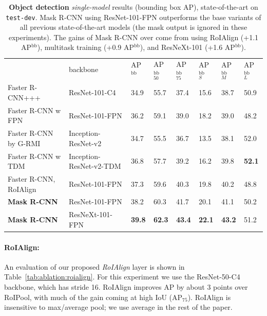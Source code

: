 \documentclass[10pt,twocolumn,letterpaper]{article}
\newcommand{\bd}[1]{\textbf{#1}}
\newcommand{\tablestyle}[2]{\setlength{\tabcolsep}{#1}\renewcommand{\arraystretch}{#2}\centering\footnotesize}
\begin{document}
\begin{table}[t]
\tablestyle{3.5pt}{1.1}
\begin{tabular}{l|l|x{22}x{22}x{22}|x{22}x{22}x{22}}
 & backbone
 & AP$^\text{bb}$ & AP$^\text{bb}_{50}$ & AP$^\text{bb}_{75}$
 & AP$^\text{bb}_S$ & AP$^\text{bb}_M$ &  AP$^\text{bb}_L$\\ [.1em]
\shline
 Faster R-CNN+++ \cite{He2016} & ResNet-101-C4
  & 34.9 & 55.7 & 37.4 & 15.6 & 38.7 & 50.9\\
 Faster R-CNN w FPN \cite{Lin2017} & ResNet-101-FPN
  & 36.2 & 59.1 & 39.0 & 18.2 & 39.0 & 48.2\\
 Faster R-CNN by G-RMI \cite{Huang2017} & Inception-ResNet-v2 \cite{Szegedy2016a}
  & 34.7 & 55.5 & 36.7 & 13.5 & 38.1 & 52.0\\
 Faster R-CNN w TDM \cite{Shrivastava2016a} & Inception-ResNet-v2-TDM
  & 36.8 & 57.7 & 39.2 & 16.2 & 39.8 & \bd{52.1}\\
\hline
  Faster R-CNN, RoIAlign & ResNet-101-FPN
  & 37.3 & 59.6 & 40.3 & 19.8 & 40.2 & 48.8\\
 \bd{Mask R-CNN} & ResNet-101-FPN
  & 38.2 & 60.3 & 41.7 & 20.1 & 41.1 & 50.2\\
 \bd{Mask R-CNN} & ResNeXt-101-FPN
  & \bd{39.8} & \bd{62.3} & \bd{43.4} & \bd{22.1} & \bd{43.2} & {51.2}
\end{tabular}\vspace{1mm}
\caption{\textbf{Object detection} \emph{single-model} results (bounding box AP), \vs state-of-the-art on \texttt{test-dev}. Mask R-CNN using ResNet-101-FPN outperforms the base variants of all previous state-of-the-art models (the mask output is ignored in these experiments). The gains of Mask R-CNN over \cite{Lin2017} come from using RoIAlign (+1.1 AP$^\text{bb}$), multitask training (+0.9 AP$^\text{bb}$), and ResNeXt-101 (+1.6 AP$^\text{bb}$).}
\label{tab:final_bbox}\vspace{-4mm}
\end{table}

\paragraph{RoIAlign:} An evaluation of our proposed \emph{RoIAlign} layer is shown in Table~\ref{tab:ablation:roialign}. For this experiment we use the ResNet-50-C4 backbone, which has stride 16. RoIAlign improves AP by about 3 points over RoIPool, with much of the gain coming at high IoU (AP$_{75}$). RoIAlign is insensitive to max/average pool; we use average in the rest of the paper.
\end{document}
